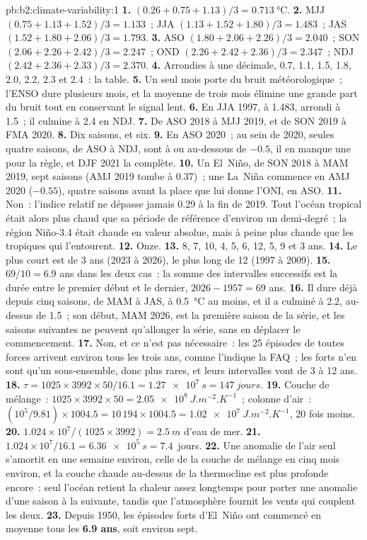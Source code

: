 \begin{solution}{pb:b2:climate-variability:1}
\textbf{1.} $(0.26 + 0.75 + 1.13)/3 = \qty{0.713}{\celsius}$.
\textbf{2.} MJJ $(0.75 + 1.13 + 1.52)/3 = 1.133$~; JJA $(1.13 + 1.52 + 1.80)/3 = 1.483$~; JAS $(1.52 +
1.80 + 2.06)/3 = 1.793$.
\textbf{3.} ASO $(1.80 + 2.06 + 2.26)/3 = 2.040$~; SON $(2.06 + 2.26 + 2.42)/3 = 2.247$~; OND $(2.26
+ 2.42 + 2.36)/3 = 2.347$~; NDJ $(2.42 + 2.36 + 2.33)/3 = 2.370$.
\textbf{4.} Arrondies à une décimale, 0.7, 1.1, 1.5, 1.8, 2.0, 2.2, 2.3 et 2.4~: la table.
\textbf{5.} Un seul mois porte du bruit météorologique~; l'ENSO dure plusieurs mois, et la moyenne de trois mois
élimine une grande part du bruit tout en conservant le signal lent.
\textbf{6.} En JJA 1997, à 1.483, arrondi à 1.5~; il culmine à 2.4 en NDJ.
\textbf{7.} De ASO 2018 à MJJ 2019, et de SON 2019 à FMA 2020.
\textbf{8.} Dix saisons, et six.
\textbf{9.} En ASO 2020~; au sein de 2020, seules quatre saisons, de ASO à NDJ, sont à ou au-dessous de $-0.5$, il en manque
une pour la règle, et DJF 2021 la complète.
\textbf{10.} Un El~Niño, de SON 2018 à MAM 2019, sept saisons (AMJ 2019 tombe à 0.37)~; une
La~Niña commence en AMJ 2020 ($-0.55$), quatre saisons avant la place que lui donne l'ONI, en ASO.
\textbf{11.} Non~: l'indice relatif ne dépasse jamais 0.29 à la fin de 2019. Tout l'océan tropical était alors
plus chaud que sa période de référence d'environ un demi-degré~; la région Niño-3.4 était chaude en valeur absolue,
mais à peine plus chaude que les tropiques qui l'entourent.
\textbf{12.} Onze.
\textbf{13.} 8, 7, 10, 4, 5, 6, 12, 5, 9 et 3 ans.
\textbf{14.} Le plus court est de 3 ans (2023 à 2026), le plus long de 12 (1997 à 2009).
\textbf{15.} $69/10 = 6.9$ ans dans les deux cas~: la somme des intervalles successifs est la durée entre le
premier début et le dernier, $2026 - 1957 = 69$ ans.
\textbf{16.} Il dure déjà depuis cinq saisons, de MAM à JAS, à \qty{0.5}{\celsius} au moins, et il a culminé à 2.2,
au-dessus de 1.5~; son début, MAM 2026, est la première saison de la série, et les saisons suivantes ne peuvent
qu'allonger la série, sans en déplacer le commencement.
\textbf{17.} Non, et ce n'est pas nécessaire~: les 25 épisodes de toutes forces arrivent environ tous les trois ans, comme l'indique la FAQ~;
les forts n'en sont qu'un sous-ensemble, donc plus rares, et leurs intervalles vont de 3 à 12 ans.
\textbf{18.} $\tau = 1025 \times 3992 \times 50/16.1 = \qty{1.27e7}{s} = \qty{147}{jours}$.
\textbf{19.} Couche de mélange~: $1025 \times 3992 \times 50 = \qty{2.05e8}{J.m^{-2}.K^{-1}}$~; colonne d'air~:
$(10^5/9.81) \times 1004.5 = 10\,194 \times 1004.5 = \qty{1.02e7}{J.m^{-2}.K^{-1}}$, 20 fois
moins.
\textbf{20.} $1.024 \times 10^7/(1025 \times 3992) = \qty{2.5}{m}$ d'eau de mer.
\textbf{21.} $1.024 \times 10^7/16.1 = \qty{6.36e5}{s} = 7.4$~jours.
\textbf{22.} Une anomalie de l'air seul s'amortit en une semaine environ, celle de la couche de mélange en
cinq mois environ, et la couche chaude au-dessus de la thermocline est plus profonde encore~: seul l'océan retient
la chaleur assez longtemps pour porter une anomalie d'une saison à la suivante, tandis que l'atmosphère fournit les
vents qui couplent les deux.
\textbf{23.} Depuis 1950, les épisodes forts d'El~Niño ont commencé en moyenne tous les \textbf{6.9 ans},
soit environ sept.
\end{solution}

